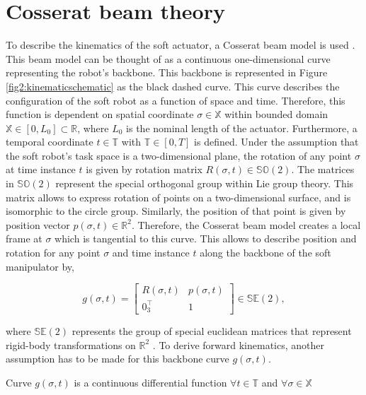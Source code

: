 \section{Cosserat beam theory}

To describe the kinematics of the soft actuator, a Cosserat beam model is used \cite{Boyer2019}. This beam model can be thought of as a continuous one-dimensional curve representing the robot's backbone. This backbone is represented in Figure \ref{fig2:kinematicschematic} as the black dashed curve. This curve describes the configuration of the soft robot as a function of space and time. Therefore, this function is dependent on spatial coordinate $\sigma \in \mathbb{X}$ within bounded domain $\mathbb{X} \in [0,L_0] \subset \mathbb{R}$, where $L_0$ is the nominal length of the actuator. Furthermore, a temporal coordinate $t \in \mathbb{T}$ with $\mathbb{T} \in [0,T]$ is defined. Under the assumption that the soft robot's task space is a two-dimensional plane, the rotation of any point $\sigma$ at time instance $t$ is given by rotation matrix $R(\sigma,t) \in \mathbb{SO}(2)$. The matrices in $\mathbb{SO}(2)$ represent the special orthogonal group within Lie group theory. This matrix allows to express rotation of points on a two-dimensional surface, and is isomorphic to the circle group. Similarly, the position of that point is given by position vector $p(\sigma,t) \in \mathbb{R}^2$. Therefore, the Cosserat beam model creates a local frame at $\sigma$ which is tangential to this curve. This allows to describe position and rotation for any point $\sigma$ and time instance $t$ along the backbone of the soft manipulator by,


\begin{equation}
    g(\sigma,t) = \begin{bmatrix}  R(\sigma,t) & p(\sigma,t) \\ 0_3^\top & 1 \end{bmatrix} \in \mathbb{SE}(2),
    \label{eq2:g}
\end{equation}

where $\mathbb{SE}(2)$ represents the group of special euclidean matrices that represent rigid-body transformations on $\mathbb{R}^2$ \cite{Sola2018}. To derive forward kinematics, another assumption has to be made for this backbone curve $g(\sigma,t)$.

\begin{theorem}
Curve  $g(\sigma,t)$ is a continuous differential function $ \forall t \in 
\mathbb{T} $ and $\forall \sigma \in \mathbb{X}$
\end{theorem}

